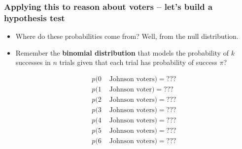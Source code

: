 \documentclass[aspectratio=169]{beamer}
\theoremstyle{principle}
\begin{document}
\begin{frame}
\frametitle{Applying this to reason about voters -- let's build a hypothesis test}

\begin{itemize}

\item Where do these probabilities come from?  Well, from the null distribution.
\bigskip

\item Remember the \textbf{binomial distribution} that models the probability of $k$ successes in $n$ trials given that each trial has probability of success $\pi$?\color{black}

\begin{align*}
p(0& \mbox{ Johnson voters}) = ???\\
p(1& \mbox{ Johnson voter}) = ???\\
p(2& \mbox{ Johnson voters}) = ???\\
p(3& \mbox{ Johnson voters}) = ???\\
p(4& \mbox{ Johnson voters}) = ???\\
p(5& \mbox{ Johnson voters}) = ???\\
p(6& \mbox{ Johnson voters}) = ???
\end{align*}

\end{itemize}

\end{frame}
\end{document}
